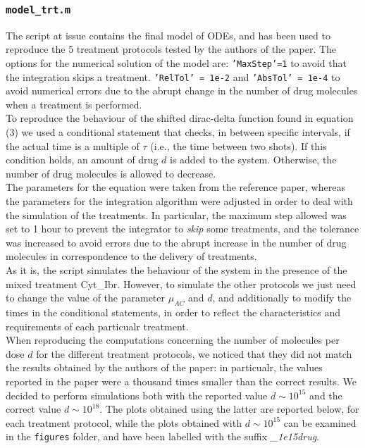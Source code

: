 \subsubsection{\texttt{model\_trt.m}}
The script at issue contains the final model of ODEs, and has been used to reproduce the 5 treatment protocols tested by the authors of the paper. The options for the numerical solution of the model are: \texttt{'MaxStep'=1} to avoid that the integration skips a treatment. \texttt{'RelTol' = 1e-2} and \texttt{'AbsTol' = 1e-4} to avoid numerical errors due to the abrupt change in the number of drug molecules when a treatment is performed.\\
To reproduce the behaviour of the shifted dirac-delta function found in equation (3) we used a conditional statement that checks, in between specific intervals, if the actual time is a multiple of $\tau$ (i.e., the time between two shots). If this condition holds, an amount of drug $d$ is added to the system. Otherwise, the number of drug molecules is allowed to decrease.\\
The parameters for the equation were taken from the reference paper, whereas the parameters for the integration algorithm were adjusted in order to deal with the simulation of the treatments. In particular, the maximum step allowed was set to 1 hour to prevent the integrator to \textit{skip} some treatments, and the tolerance was increased to avoid errors due to the abrupt increase in the number of drug molecules in correspondence to the delivery of treatments.\\
As it is, the script simulates the behaviour of the system in the presence of the mixed treatment Cyt_Ibr. However, to simulate the other protocols we just need to change the value of the parameter $\mu_{AC}$ and $d$, and additionally to modify the times in the conditional statements, in order to reflect the characteristics and requirements of each particualr treatment. \\
When reproducing the computations concerning the number of molecules per dose $d$ for the different treatment protocols, we noticed that they did not match the results obtained by the authors of the paper: in particualr, the values reported in the paper were a thousand times smaller than the correct results. We decided to perform simulations both with the reported value $d \sim 10^{15}$ and the correct value $d \sim 10^{18}$. The plots obtained using the latter are reported below, for each treatment protocol, while the plots obtained with $d \sim 10^{15}$ can be examined in the \texttt{figures} folder, and have been labelled with the suffix \textit{_1e15drug}. \\
